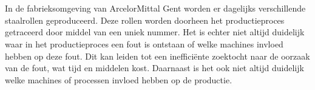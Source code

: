 
%
%
%
%
%

%



\chapter*{}
In de fabrieksomgeving van ArcelorMittal Gent worden er dagelijks verschillende staalrollen geproduceerd.
Deze rollen worden doorheen het productieproces getraceerd door middel van een uniek nummer.
Het is echter niet altijd duidelijk waar in het productieproces een fout is ontstaan of welke machines invloed hebben op deze fout.
Dit kan leiden tot een inefficiënte zoektocht naar de oorzaak van de fout, wat tijd en middelen kost.
Daarnaast is het ook niet altijd duidelijk welke machines of processen invloed hebben op de productie.

